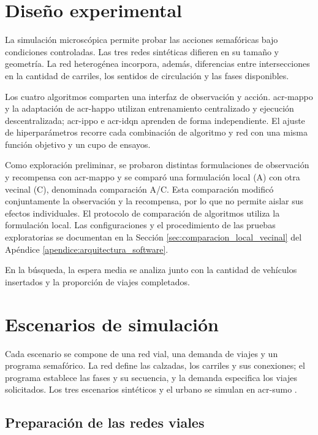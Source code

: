 \section{Diseño experimental}
\label{sec:tarea_investigacion}
\label{sec:enfoque_diseno}

La simulación microscópica permite probar las acciones semafóricas bajo condiciones controladas. Las tres redes sintéticas difieren en su tamaño y geometría. La red heterogénea incorpora, además, diferencias entre intersecciones en la cantidad de carriles, los sentidos de circulación y las fases disponibles.

Los cuatro algoritmos comparten una interfaz de observación y acción. \acrshort{acr-mappo} y la adaptación de \acrshort{acr-happo} utilizan entrenamiento centralizado y ejecución descentralizada; \acrshort{acr-ippo} e \acrshort{acr-idqn} aprenden de forma independiente. El ajuste de hiperparámetros recorre cada combinación de algoritmo y red con una misma función objetivo y un cupo de ensayos.

Como exploración preliminar, se probaron distintas formulaciones de observación y recompensa con \acrshort{acr-mappo} y se comparó una formulación local (A) con otra vecinal (C), denominada comparación A/C. Esta comparación modificó conjuntamente la observación y la recompensa, por lo que no permite aislar sus efectos individuales. El protocolo de comparación de algoritmos utiliza la formulación local. Las configuraciones y el procedimiento de las pruebas exploratorias se documentan en la Sección \ref{sec:comparacion_local_vecinal} del Apéndice \ref{apendice:arquitectura_software}.

En la búsqueda, la espera media se analiza junto con la cantidad de vehículos insertados y la proporción de viajes completados.

\section{Escenarios de simulación}
\label{sec:diseno_escenarios}

Cada escenario se compone de una red vial, una demanda de viajes y un programa semafórico. La red define las calzadas, los carriles y sus conexiones; el programa establece las \glspl{fase} y su secuencia, y la demanda especifica los viajes solicitados. Los tres escenarios sintéticos y el urbano se simulan en \acrshort{acr-sumo} \cite{lopez2018sumo,SUMO2026_SUMO}.

\subsection{Preparación de las redes viales}
\label{subsec:metodologia_modelado_sumo}

